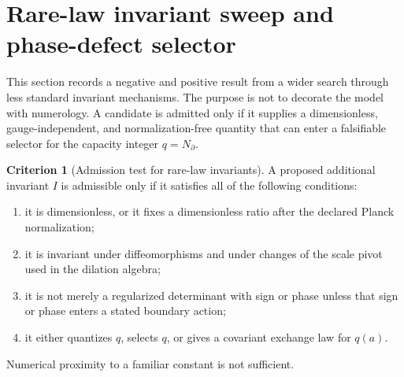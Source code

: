 \documentclass[aps,prd,reprint,nofootinbib,superscriptaddress,floatfix]{revtex4-2}
\numberwithin{equation}{section}
\theoremstyle{definition}
\newtheorem{criterion}{Criterion}[section]
\theoremstyle{plain}
\begin{document}
\section{Rare-law invariant sweep and phase-defect selector}

This section records a negative and positive result from a wider
search through less standard invariant mechanisms.  The purpose is not
to decorate the model with numerology.  A candidate is admitted only if
it supplies a dimensionless, gauge-independent, and normalization-free
quantity that can enter a falsifiable selector for the capacity integer
\(q=N_\partial\).

\begin{criterion}[Admission test for rare-law invariants]
A proposed additional invariant \(I\) is admissible only if it satisfies
all of the following conditions:
\begin{enumerate}
\item it is dimensionless, or it fixes a dimensionless ratio after the
declared Planck normalization;
\item it is invariant under diffeomorphisms and under changes of the
scale pivot used in the dilation algebra;
\item it is not merely a regularized determinant with sign or phase
unless that sign or phase enters a stated boundary action;
\item it either quantizes \(q\), selects \(q\), or gives a covariant
exchange law for \(q(a)\).
\end{enumerate}
Numerical proximity to a familiar constant is not sufficient.
\end{criterion}
\end{document}
